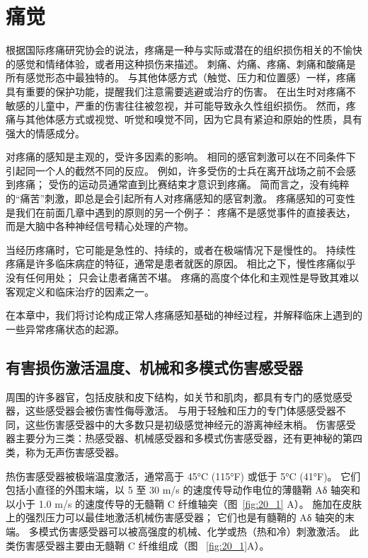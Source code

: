 \chapter{痛觉} \label{chap:chap20}

根据国际疼痛研究协会的说法，疼痛是一种与实际或潜在的组织损伤相关的不愉快的感觉和情绪体验，或者用这种损伤来描述。
刺痛、灼痛、疼痛、刺痛和酸痛是所有感觉形态中最独特的。
与其他体感方式（触觉、压力和位置感）一样，疼痛具有重要的保护功能，提醒我们注意需要逃避或治疗的伤害。 
在出生时对疼痛不敏感的儿童中，严重的伤害往往被忽视，并可能导致永久性组织损伤。
然而，疼痛与其他体感方式或视觉、听觉和嗅觉不同，因为它具有紧迫和原始的性质，具有强大的情感成分。


对疼痛的感知是主观的，受许多因素的影响。
相同的感官刺激可以在不同条件下引起同一个人的截然不同的反应。
例如，许多受伤的士兵在离开战场之前不会感到疼痛；
受伤的运动员通常直到比赛结束才意识到疼痛。
简而言之，没有纯粹的“痛苦”刺激，即总是会引起所有人对疼痛感知的感官刺激。
疼痛感知的可变性是我们在前面几章中遇到的原则的另一个例子：
疼痛不是感觉事件的直接表达，而是大脑中各种神经信号精心处理的产物。


当经历疼痛时，它可能是急性的、持续的，或者在极端情况下是慢性的。
持续性疼痛是许多临床病症的特征，通常是患者就医的原因。
相比之下，慢性疼痛似乎没有任何用处；
只会让患者痛苦不堪。
疼痛的高度个体化和主观性是导致其难以客观定义和临床治疗的因素之一。


在本章中，我们将讨论构成正常人疼痛感知基础的神经过程，并解释临床上遇到的一些异常疼痛状态的起源。



\section{有害损伤激活温度、机械和多模式伤害感受器}

周围的许多器官，包括皮肤和皮下结构，如关节和肌肉，都具有专门的感觉感受器，这些感受器会被伤害性侮辱激活。
与用于轻触和压力的专门体感感受器不同，这些伤害感受器中的大多数只是初级感觉神经元的游离神经末梢。
伤害感受器主要分为三类：热感受器、机械感受器和多模式伤害感受器，还有更神秘的第四类，称为无声伤害感受器。


热伤害感受器被极端温度激活，通常高于 45°C (115°F) 或低于 5°C (41°F)。
它们包括小直径的外围末端，以 5 至 30 m/s 的速度传导动作电位的薄髓鞘 Aδ 轴突和以小于 1.0 m/s 的速度传导的无髓鞘 C 纤维轴突（图~\ref{fig:20_1} A）。
施加在皮肤上的强烈压力可以最佳地激活机械伤害感受器；
它们也是有髓鞘的 Aδ 轴突的末端。
多模式伤害感受器可以被高强度的机械、化学或热（热和冷）刺激激活。
此类伤害感受器主要由无髓鞘 C 纤维组成（图 ~\ref{fig:20_1}A）。


